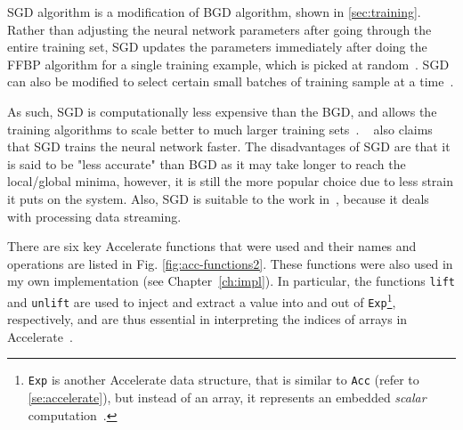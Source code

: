 SGD algorithm is a modification of BGD algorithm, shown in \ref{sec:training}. Rather than adjusting the neural network parameters after going through the entire training set, SGD updates the parameters immediately after doing the FFBP algorithm for a single training example, which is picked at random~\cite{Ng12}. SGD can also be modified to select certain small batches of training sample at a time~\cite{LeC98}. 

As such, SGD is computationally less expensive than the BGD, and allows the training algorithms to scale better to much larger training sets~\cite{Ng12}. ~\cite{LeCBosDen89} also claims that SGD trains the neural network faster. The disadvantages of SGD are that it is said to be "less accurate" than BGD as it may take longer to reach the local/global minima, however, it is still the more popular choice due to less strain it puts on the system. Also, SGD is suitable to the work in~\cite{Eve16}, because it deals with processing data streaming.

There are six key Accelerate functions that were used and their names and operations are listed in Fig. \ref{fig:acc-functions2}. These functions were also used in my own implementation (see Chapter~\ref{ch:impl}). In particular, the functions \texttt{lift} and \texttt{unlift} are used to inject and extract a value into and out of \texttt{Exp}\footnote{\texttt{Exp} is another Accelerate data structure, that is similar to \texttt{Acc} (refer to \ref{se:accelerate}), but instead of an array, it represents an embedded \textit{scalar} computation~\cite{ChaKelLee11}.}, respectively, and are thus essential in interpreting the indices of arrays in Accelerate~\cite{Mar13}.

